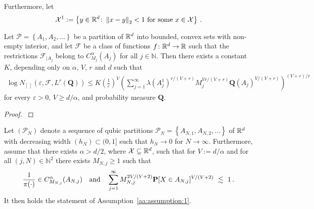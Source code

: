 Furthermore, let
\begin{gather*}
  \mathcal{X}^1
  :=
  \left\{ 
    y\in\R^d
    \colon
    \norm{x-y}_2 <1
    \ 
    \text{for some}\ x\in\mathcal{X}
  \right\}
  \,.
\end{gather*}
\begin{lemma}
  \label{vdv_coro}
  Let $\mathcal{P}=\left\{ A_1,A_2,\ldots \right\}$ be a partition of $\mathbb{R}^d$ into bounded, convex sets with non-empty interior, and let $\mathcal{F}$ be a class of functions $f\colon\mathbb{R}^d\to\mathbb{R}$ such that the restrictions $\mathcal{F}_{|A_j}$ belong to $C^\alpha_{M_j}(A_j)$
  for all $j\in\mathbb{N}$.
  Then there exists a constant $K$, depending only on $\alpha$, $V$, $r$ and $d$
  such that
  \begin{gather}
    \label{667}
    \log
    N_{[\,]}
    (
    \varepsilon
    ,
    \mathcal{F}
    ,
    L^r(\mathbf{Q})
    )
    \le
    K
    \left( \frac{1}{\varepsilon} \right)^V
    \left( 
      \sum_{j=1}^{\infty}
      \lambda(A_j^1)^{r/(V+r)}
      M_j^{Vr/(V+r)}
      \mathbf{Q}(A_j)^{V/(V+r)}
    \right)
    ^{(V+r)/r}
  \end{gather}
  for every $\varepsilon>0$, $V\ge d/\alpha$, and probability measure $\mathbf{Q}$.
\end{lemma}
\begin{proof}
  \emph{\cite[Corollary~2.7.4]{vaart2013}}
\end{proof}
\pagebreak
\begin{lemma}
  Let $(\mathcal{P}_N)$ denote a sequence of qubic partitions
  $\mathcal{P}_N=\left\{ A_{N,1},A_{N,2},\ldots \right\}$ 
  of $\mathbb{R}^d$ 
  with decreasing width $(h_N)\subset(0,1]$ such that $h_N\to 0$ for $N\to\infty$.
  Furthermore, assume that there exists
  $\alpha>d/2$, where $\mathcal{X}\subseteq \mathbb{R}^d$, such
  that for 
  $V:=d/\alpha$
 and for all 
$
(j,N)\in\mathbb{N}^2
$
there exists 
$M_{N,j}\ge 1$ such that 
\begin{gather}
  \label{897}
  \frac{1}{\pi(\cdot)}
  \in C^\alpha_{M_{N,j}}(A_{N,j})
  \quad
  \text{and}
  \quad
  \sum_{j=1}^{\infty} 
  M_{N,j}^{2V/(V+2)}
  \P
  [
  X\in A_{N,j}
  ]^{V/(V+2)}
  \ 
  \lesssim
  \ 
  1
  \,.
\end{gather}
It then holds the statement of Assumption~\ref{aa:assumption:1}.
\end{lemma}
